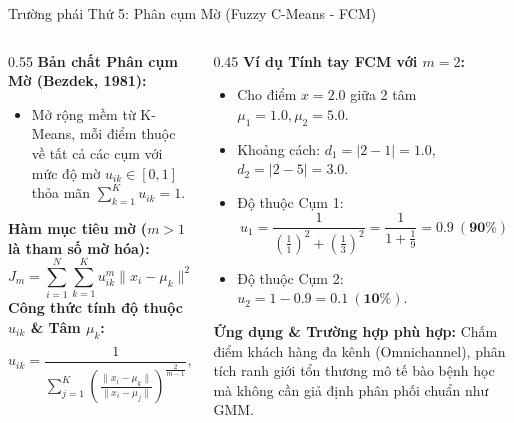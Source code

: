 \documentclass[aspectratio=169,10pt]{beamer}
\begin{document}
\begin{frame}{Trường phái Thứ 5: Phân cụm Mờ (Fuzzy C-Means - FCM)}
  \small
  \begin{columns}[T]
    \begin{column}{0.55\textwidth}
      \textbf{Bản chất Phân cụm Mờ (Bezdek, 1981):}
      \begin{itemize}\setlength{\itemsep}{1pt}
        \item Mở rộng mềm từ K-Means, mỗi điểm thuộc về tất cả các cụm với mức độ mờ $u_{ik} \in [0, 1]$ thỏa mãn $\sum_{k=1}^K u_{ik} = 1$.
      \end{itemize}
      \textbf{Hàm mục tiêu mờ ($m > 1$ là tham số mờ hóa):}
      $$J_m = \sum_{i=1}^N \sum_{k=1}^K u_{ik}^m \|x_i - \mu_k\|^2 \to \min$$
      \textbf{Công thức tính độ thuộc $u_{ik}$ \& Tâm $\mu_k$:}
      $$u_{ik} = \frac{1}{\sum_{j=1}^K \left(\frac{\|x_i - \mu_k\|}{\|x_i - \mu_j\|}\right)^{\frac{2}{m-1}}}, \quad \mu_k = \frac{\sum_{i=1}^N u_{ik}^m x_i}{\sum_{i=1}^N u_{ik}^m}$$
    \end{column}
    \begin{column}{0.45\textwidth}
      \textbf{Ví dụ Tính tay FCM với $m=2$:}
      \begin{itemize}\setlength{\itemsep}{1.5pt}\scriptsize
        \item Cho điểm $x=2.0$ giữa 2 tâm $\mu_1=1.0, \mu_2=5.0$.
        \item Khoảng cách: $d_1 = |2-1|=1.0$, $d_2 = |2-5|=3.0$.
        \item Độ thuộc Cụm 1:
          $$u_1 = \frac{1}{\left(\frac{1}{1}\right)^2 + \left(\frac{1}{3}\right)^2} = \frac{1}{1 + \frac{1}{9}} = \mathbf{0.9\ (90\%)}$$
        \item Độ thuộc Cụm 2: $u_2 = 1 - 0.9 = \mathbf{0.1\ (10\%)}$.
      \end{itemize}
      \vspace{0.3em}
      \textbf{Ứng dụng \& Trường hợp phù hợp:}
      Chấm điểm khách hàng đa kênh (Omnichannel), phân tích ranh giới tổn thương mô tế bào bệnh học mà không cần giả định phân phối chuẩn như GMM.
    \end{column}
  \end{columns}
\end{frame}
\end{document}
